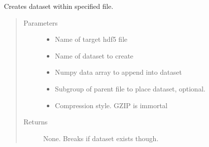 \documentclass[letterpaper,10pt,english]{sphinxmanual}
\begin{document}

\begin{fulllineitems}
\label{\detokenize{index:HDF5Methods.createDataset}}
\sphinxAtStartPar
Creates dataset within specified file.
\begin{quote}\begin{description}
\item[{Parameters}] \leavevmode\begin{itemize}
\item {} 
\sphinxAtStartPar
{} \textendash{} Name of target hdf5 file

\item {} 
\sphinxAtStartPar
{} \textendash{} Name of dataset to create

\item {} 
\sphinxAtStartPar
{} \textendash{} Numpy data array to append into dataset

\item {} 
\sphinxAtStartPar
{} \textendash{} Subgroup of parent file to place dataset, optional.

\item {} 
\sphinxAtStartPar
{} \textendash{} Compression style. GZIP is immortal

\end{itemize}

\item[{Returns}] \leavevmode
\sphinxAtStartPar
None. Breaks if dataset exists though.

\end{description}\end{quote}

\end{fulllineitems}

\end{document}
